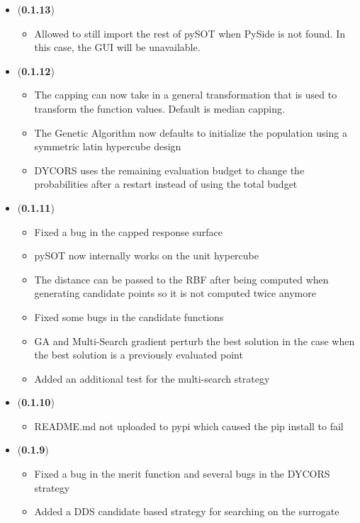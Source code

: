 \documentclass[]{article}
\begin{document}
\begin{itemize}
\item (\textbf{0.1.13}) 
\begin{itemize}
\item Allowed to still import the rest of pySOT when PySide is not found. In this case, the GUI will be unavailable.
\end{itemize}

\item (\textbf{0.1.12}) 
\begin{itemize}
\item The capping can now take in a general transformation that is used to transform the function values. Default is median capping.
\item The Genetic Algorithm now defaults to initialize the population using a symmetric latin hypercube design
\item DYCORS uses the remaining evaluation budget to change the probabilities after a restart instead of using the total budget 
\end{itemize}

\item (\textbf{0.1.11}) 
\begin{itemize}
\item Fixed a bug in the capped response surface
\item pySOT now internally works on the unit hypercube
\item The distance can be passed to the RBF after being computed when generating candidate points so it is not computed twice anymore
\item Fixed some bugs in the candidate functions
\item GA and Multi-Search gradient perturb the best solution in the case when the best solution is a previously evaluated point
\item Added an additional test for the multi-search strategy
\end{itemize}

\item (\textbf{0.1.10}) 
\begin{itemize}
\item README.md not uploaded to pypi which caused the pip install to fail
\end{itemize}

\item (\textbf{0.1.9}) 
\begin{itemize}
\item Fixed a bug in the merit function and several bugs in the DYCORS strategy
\item Added a DDS candidate based strategy for searching on the surrogate
\end{itemize}


\end{itemize}
\end{document}
